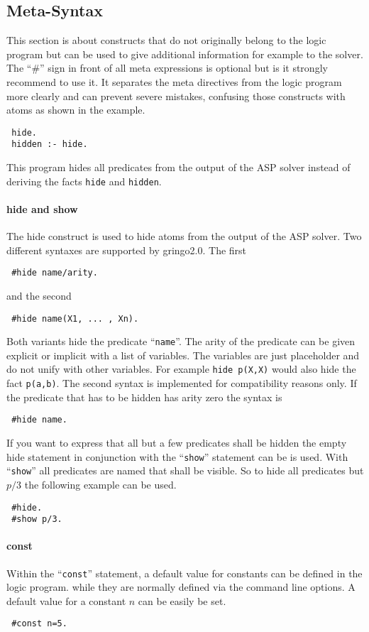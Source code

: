 \documentclass[a4paper,10pt]{article}
\begin{document}
\subsection{Meta-Syntax}
This section is about constructs that do not originally belong to the logic program but can be used to give additional information for example to the solver.
The ``\#'' sign in front of all meta expressions is optional but is it strongly recommend to use it.
It separates the meta directives from the logic program more clearly and can prevent severe mistakes,
 confusing those constructs with atoms as shown in the example.
\begin{verbatim}
 hide.
 hidden :- hide.
\end{verbatim}
This program hides all predicates from the output of the ASP solver instead of deriving the facts \texttt{hide} and \texttt{hidden}.

\paragraph{hide and show}
The hide construct is used to hide atoms from the output of the ASP solver.
Two different syntaxes are supported by gringo2.0.
The first 
\begin{verbatim}
 #hide name/arity.
\end{verbatim}
and the second
\begin{verbatim}
 #hide name(X1, ... , Xn).
\end{verbatim}
Both variants hide the predicate ``\texttt{name}''.
The arity of the predicate can be given explicit or implicit with a list of variables.
The variables are just placeholder and do not unify with other variables. For example \texttt{hide p(X,X)} would also hide the fact \texttt{p(a,b)}. The second syntax is implemented for compatibility reasons only.
If the predicate that has to be hidden has arity zero the syntax is
\begin{verbatim}
 #hide name.
\end{verbatim}
If you want to express that all but a few predicates shall be hidden the empty hide statement
in conjunction with the ``\texttt{show}'' statement can be is used.
With ``\texttt{show}'' all predicates are named that shall be visible.
So to hide all predicates but $p/3$ the following example can be used.
\begin{verbatim}
 #hide.
 #show p/3.
\end{verbatim}

\paragraph{const}
Within the ``\texttt{const}'' statement, a default value for constants can be defined in the logic program.
while they are normally defined via the command line options.
A default value for a constant $n$ can be easily be set.
\begin{verbatim}
 #const n=5.
\end{verbatim}
\end{document}
